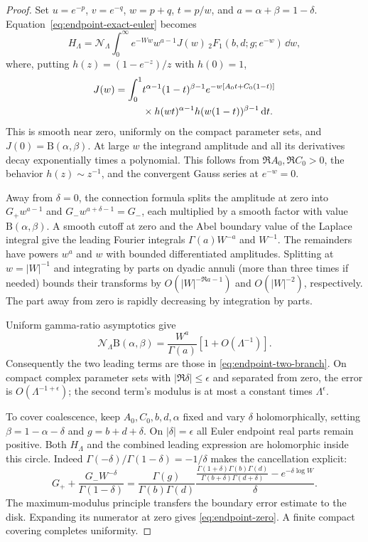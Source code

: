 \begin{proof}
Set $u=e^{-p}$, $v=e^{-q}$, $w=p+q$, $t=p/w$, and
$a=\alpha+\beta=1-\delta$. Equation~\eqref{eq:endpoint-exact-euler} becomes
\begin{equation}
 H_\Lambda=\mathcal N_\Lambda\int_0^\infty e^{-Ww}
        w^{a-1}J(w)\,{}_2F_1(b,d;g;e^{-w})\,\dd w,
 \label{eq:endpoint-fourier}
\end{equation}
where, putting $h(z)=(1-e^{-z})/z$ with $h(0)=1$,
\begin{align}
 J(w)=\int_0^1 &t^{\alpha-1}(1-t)^{\beta-1}
 e^{-w[A_0t+C_0(1-t)]}\notag\\
 &\times h(wt)^{\alpha-1}h(w(1-t))^{\beta-1}\mathop{}\!\mathrm d t.
 \label{eq:endpoint-J}
\end{align}
This is smooth near zero, uniformly on the compact parameter sets, and
$J(0)=\mathrm B(\alpha,\beta)$. At large $w$ the integrand amplitude
and all its derivatives decay exponentially times a polynomial. This
follows from $\Re A_0,\Re C_0>0$, the behavior $h(z)\sim z^{-1}$,
and the convergent Gauss series at $e^{-w}=0$.

Away from $\delta=0$, the connection formula splits the amplitude at zero
into $G_+w^{a-1}$ and $G_-w^{a+\delta-1}=G_-$, each multiplied by a smooth
factor with value $\mathrm B(\alpha,\beta)$. A smooth cutoff at zero and
the Abel boundary value of the Laplace integral give the leading Fourier
integrals $\Gamma(a)W^{-a}$ and $W^{-1}$. The remainders have powers
$w^a$ and $w$ with bounded differentiated amplitudes. Splitting at
$w=|W|^{-1}$ and integrating by parts on dyadic annuli (more than three
times if needed) bounds their transforms by
$O(|W|^{-\Re a-1})$ and $O(|W|^{-2})$, respectively. The part away from
zero is rapidly decreasing by integration by parts.

Uniform gamma-ratio asymptotics give
\[
 \mathcal N_\Lambda\mathrm B(\alpha,\beta)
 =\frac{W^a}{\Gamma(a)}[1+O(\Lambda^{-1})].
\]
Consequently the two leading terms are those in
\eqref{eq:endpoint-two-branch}. On compact complex parameter sets with
$|\Re\delta|\le\epsilon$ and separated from zero, the error is
$O(\Lambda^{-1+\epsilon})$; the second term's modulus is at most a constant
times $\Lambda^\epsilon$.

To cover coalescence, keep $A_0,C_0,b,d,\alpha$ fixed and vary $\delta$
holomorphically, setting $\beta=1-\alpha-\delta$ and $g=b+d+\delta$.
On $|\delta|=\epsilon$ all Euler endpoint real parts remain positive.
Both $H_\Lambda$ and the combined leading expression are holomorphic
inside this circle. Indeed $\Gamma(-\delta)/\Gamma(1-\delta)=-1/\delta$
makes the cancellation explicit:
\begin{equation}
 G_++\frac{G_-W^{-\delta}}{\Gamma(1-\delta)}
 =\frac{\Gamma(g)}{\Gamma(b)\Gamma(d)}
 \frac{\displaystyle
  \frac{\Gamma(1+\delta)\Gamma(b)\Gamma(d)}
       {\Gamma(b+\delta)\Gamma(d+\delta)}-e^{-\delta\log W}}
 {\delta}.
 \label{eq:endpoint-stable}
\end{equation}
The maximum-modulus principle transfers the boundary error estimate
to the disk. Expanding its numerator at zero gives
\eqref{eq:endpoint-zero}. A finite compact covering completes uniformity.
\end{proof}

